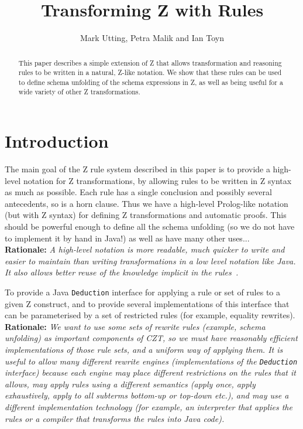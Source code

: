 \documentclass{article}
\title{Transforming Z with Rules}
\author{Mark Utting, Petra Malik and Ian Toyn}
\newenvironment{Rationale}{\\ \textbf{Rationale:}\it}{}
\begin{document}
\maketitle

\begin{abstract}
This paper describes a simple extension of Z that allows transformation and reasoning rules to be written in a natural, Z-like notation.  We show that these rules can be used to define schema unfolding of the schema expressions in Z, as well as being useful for a wide variety of other Z transformations.  
\end{abstract}

\section{Introduction}

The main goal of the Z rule system described in this paper is
to provide a high-level notation for Z transformations, by
allowing rules to be written in Z syntax as much as possible.  Each
rule has a single conclusion and possibly several antecedents, so is a
horn clause.  Thus we have a high-level Prolog-like notation (but with
Z syntax) for defining Z transformations and automatic proofs.  This
should be powerful enough to define all the schema unfolding (so we do
not have to implement it by hand in Java!) as well as have many other
uses...
  \begin{Rationale}
    A high-level notation is more readable, much quicker
    to write and easier to maintain than writing transformations in
    a low level notation like Java.  It also allows better reuse of the
    knowledge implicit in the rules~\cite{DenningACM}.
  \end{Rationale}

To provide a Java \texttt{Deduction} interface for applying a rule or
set of rules to a given Z construct, and to provide several
implementations of this interface that can be parameterised by a set
of restricted rules (for example, equality rewrites).
  \begin{Rationale} 
  We want to use some sets of rewrite rules
  (example, schema unfolding) as important components of CZT, so we
  must have reasonably efficient implementations of those rule sets,
  and a uniform way of applying them.  It is useful to allow many
  different rewrite engines (implementations of the \texttt{Deduction}
  interface) because each engine may place different restrictions on
  the rules that it allows, may apply rules using a different
  semantics (apply once, apply exhaustively, apply to all subterms
  bottom-up or top-down etc.), and may use a different implementation
  technology (for example, an interpreter that applies the rules or a
  compiler that transforms the rules into Java code).
  \end{Rationale}
\end{document}
